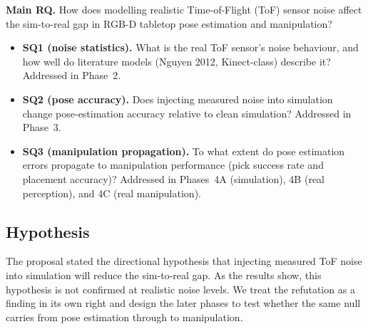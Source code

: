 \noindent\textbf{Main RQ.} How does modelling realistic Time-of-Flight (ToF) sensor
noise affect the sim-to-real gap in RGB-D tabletop pose estimation and manipulation?
\begin{itemize}
  \item \textbf{SQ1 (noise statistics).} What is the real ToF sensor's noise behaviour,
  and how well do literature models (Nguyen 2012, Kinect-class) describe it? Addressed in
  Phase~2.
  \item \textbf{SQ2 (pose accuracy).} Does injecting measured noise into simulation
  change pose-estimation accuracy relative to clean simulation? Addressed in Phase~3.
  \item \textbf{SQ3 (manipulation propagation).} To what extent do pose estimation errors
  propagate to manipulation performance (pick success rate and placement accuracy)?
  Addressed in Phases~4A (simulation), 4B (real perception), and 4C (real manipulation).
\end{itemize}

\subsection{Hypothesis}
The proposal stated the directional hypothesis that injecting measured ToF noise into
simulation will reduce the sim-to-real gap. As the results show, this hypothesis is not
confirmed at realistic noise levels. We treat the refutation as a finding in its own
right and design the later phases to test whether the same null carries from pose
estimation through to manipulation.


